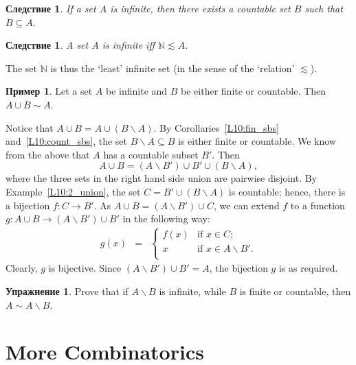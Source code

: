 \documentclass[12pt,notitlepage]{article}
\theoremstyle{plain}
\newtheorem{corr}[thm]{Следствие}
\theoremstyle{definition}
\newtheorem{exc}[thm]{Упражнение}
\newtheorem{exm}[thm]{Пример}
\theoremstyle{plain}
\newcommand{\N}{\mathbb{N}}
\newcommand{\sbs}{\subseteq}
\renewcommand{\setminus}{\smallsetminus}
\newcommand{\1}{\mathbf{1}}
\newcommand{\0}{\mathbf{0}}
\newcommand{\mcomm}[1]{}
\begin{document}
\begin{corr}
	If a set $A$ is infinite, then there exists a countable set $B$ such that $B \sbs A$.
\end{corr}

\begin{corr}\label{L10:min_inf_corr}
	A set $A$ is infinite iff $\N \lesssim A$.
\end{corr}
\noindent The set $\N$ is thus the `least' infinite set (in the sense of the `relation' ${\lesssim}$).

\begin{exm}
	Let a set $A$ be infinite and $B$ be either finite or countable. Then $A \cup B \sim A$.
	
	Notice that $A \cup B = A \cup (B \setminus A)$. By Corollaries~\ref{L10:fin_sbs} and~\ref{L10:count_sbs}, the set $B \setminus A \sbs B$ is either finite or countable. We know from the above that $A$ has a countable subset $B'$. Then
	$$A \cup B = (A \setminus B') \cup B' \cup (B \setminus A),$$
	where the three sets in the right hand side union are pairwise disjoint. By Example~\ref{L10:2_union}, the set $C = B' \cup (B \setminus A)$ is countable; hence, there is a bijection $f\colon C \to B'$. As $A \cup B = (A \setminus B') \cup C$, we can extend $f$ to a function $g\colon A \cup B \to (A \setminus B') \cup B'$ in the following way:
	$$
	\begin{array}{rcll}
		g(x) &=& \begin{cases}
			f(x)&\mbox{if } x \in C;\\
			x&\mbox{if } x \in A \setminus B'.\\
		\end{cases}
	\end{array}
	$$
	Clearly, $g$ is bijective. Since $(A \setminus B') \cup B' = A$, the bijection $g$ is as required.
\end{exm}

\begin{exc}
	Prove that if $A \setminus B$ is infinite, while $B$ is finite or countable, then $A \sim A \setminus B$.
\end{exc}

\section{More Combinatorics}
\mcomm{Traditionally, the elements of combinatorics are presented informally, with very little reference to set theory. The benefits of this approach are well-known, but it has clear drawbacks in the context of a set-based course: first, it breaks the logical sequence of presentation (so that the Student may think set theory axioms are useless and inadequate for ``everyday mathematics'' besides being abstract and possibly indigestible); second, our intuition is limited, so one may lose comprehension beyond some point with little chance to dissect a complicated intuitive argument into primitive steps. Therefore, our approach is to make combinatorial computations as close to set-theoretic primitives as reasonably possible. Of course, enough practice will develop the Student's intuition so that he can see traditional arguments as shorthands for formal ones.}
\end{document}
